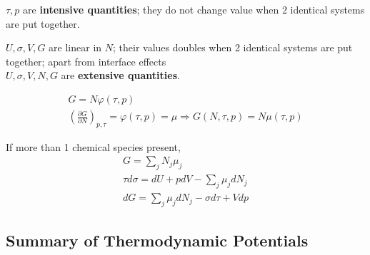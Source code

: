 \documentclass[10pt]{amsart}
\begin{document}
\begin{multicols*}{2}
$\tau,p$ are \textbf{intensive quantities}; they do not change value when 2 identical systems are put together.  

$U,\sigma,V,G$ are linear in $N$; their values doubles when 2 identical systems are put together; apart from interface effects \\
$U,\sigma,V,N,G$ are \textbf{extensive quantities}.  


\[
\begin{gathered}
G = N\varphi(\tau,p) \\
\left( \frac{ \partial G}{ \partial N} \right)_{p,\tau} = \varphi(\tau,p) = \mu \Longrightarrow G(N,\tau,p) = N\mu(\tau,p)
\end{gathered}
\]

If more than 1 chemical species present, 
\begin{equation}\label{Eq:Gibbspotential}
  \boxed{ 
    \begin{gathered}
      G = \sum_j N_j \mu_j  \\
      \tau d\sigma = dU + pdV - \sum_j \mu_j dN_j \\
      dG = \sum_j \mu_j dN_j - \sigma d\tau + Vdp 
      \end{gathered}
    }
\end{equation}


\subsection{Summary of Thermodynamic Potentials}


\end{multicols*}
\end{document}
